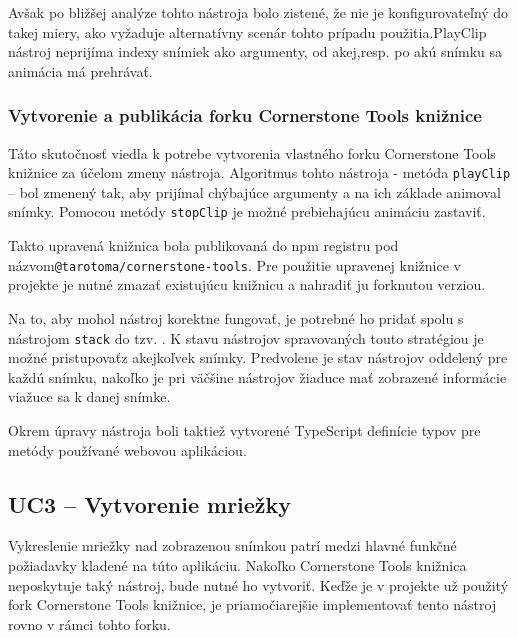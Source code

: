 Avšak po bližšej analýze tohto nástroja bolo zistené, že nie je konfigurovateľný do takej miery, ako vyžaduje alternatívny scenár tohto prípadu použitia.\newline PlayClip nástroj neprijíma indexy snímiek ako argumenty, od akej,\newline resp. po akú snímku sa animácia má prehrávať.

\subsubsection {Vytvorenie a publikácia forku Cornerstone Tools knižnice}
Táto skutočnosť viedla k potrebe vytvorenia vlastného forku Cornerstone Tools knižnice za účelom zmeny  nástroja. Algoritmus tohto nástroja - metóda \texttt{playClip} -- bol zmenený tak, aby prijímal chýbajúce argumenty a na ich základe animoval snímky. Pomocou metódy \texttt{stopClip} je možné prebiehajúcu animáciu zastaviť.

Takto upravená knižnica bola publikovaná do npm registru pod názvom\newline \texttt{@tarotoma/cornerstone-tools}. Pre použitie upravenej knižnice v projekte je nutné zmazať existujúcu knižnicu a nahradiť ju forknutou verziou. 

Na to, aby mohol  nástroj korektne fungovať, je potrebné ho pridať spolu s nástrojom \texttt{stack} do tzv. . K stavu nástrojov spravovaných touto stratégiou je možné pristupovať\newline z akejkoľvek snímky. Predvolene je stav nástrojov oddelený pre každú snímku, nakoľko je pri väčšine nástrojov žiaduce mať zobrazené informácie viažuce sa k danej snímke.

Okrem úpravy  nástroja boli taktiež vytvorené TypeScript definície typov pre metódy používané webovou aplikáciou.

\clearpage

\subsection {UC3 -- Vytvorenie mriežky}
Vykreslenie mriežky nad zobrazenou snímkou patrí medzi hlavné funkčné požiadavky kladené na túto aplikáciu. Nakoľko Cornerstone Tools knižnica neposkytuje taký nástroj, bude nutné ho vytvoriť. Keďže je v projekte už použitý fork Cornerstone Tools knižnice, je priamočiarejšie implementovať tento nástroj rovno v rámci tohto forku.

